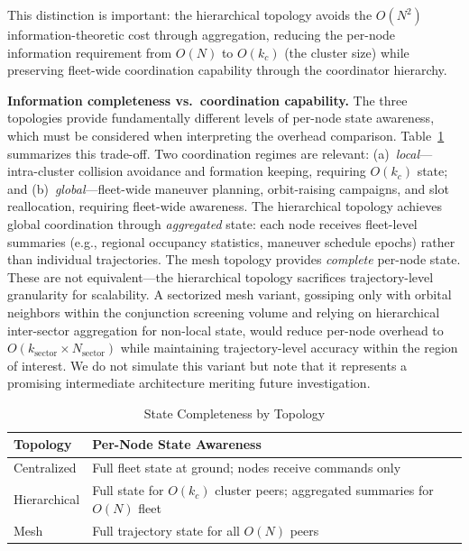 \documentclass[journal]{IEEEtran}
\begin{document}
This distinction is important: the hierarchical topology avoids the $O(N^2)$ information-theoretic cost through aggregation, reducing the per-node information requirement from $O(N)$ to $O(k_c)$ (the cluster size) while preserving fleet-wide coordination capability through the coordinator hierarchy.

\textbf{Information completeness vs.\ coordination capability.} The three topologies provide fundamentally different levels of per-node state awareness, which must be considered when interpreting the overhead comparison. Table~\ref{tab:state_completeness} summarizes this trade-off. Two coordination regimes are relevant: (a)~\emph{local}---intra-cluster collision avoidance and formation keeping, requiring $O(k_c)$ state; and (b)~\emph{global}---fleet-wide maneuver planning, orbit-raising campaigns, and slot reallocation, requiring fleet-wide awareness. The hierarchical topology achieves global coordination through \emph{aggregated} state: each node receives fleet-level summaries (e.g., regional occupancy statistics, maneuver schedule epochs) rather than individual trajectories. The mesh topology provides \emph{complete} per-node state. These are not equivalent---the hierarchical topology sacrifices trajectory-level granularity for scalability. A sectorized mesh variant, gossiping only with orbital neighbors within the conjunction screening volume and relying on hierarchical inter-sector aggregation for non-local state, would reduce per-node overhead to $O(k_{\text{sector}} \times N_{\text{sector}})$ while maintaining trajectory-level accuracy within the region of interest. We do not simulate this variant but note that it represents a promising intermediate architecture meriting future investigation.

\begin{table}[t]
    \centering
    \caption{State Completeness by Topology}
    \label{tab:state_completeness}
    \begin{tabular}{@{}lp{5.5cm}@{}}
        \toprule
        \textbf{Topology} & \textbf{Per-Node State Awareness} \\
        \midrule
        Centralized  & Full fleet state at ground; nodes receive commands only \\
        Hierarchical & Full state for $O(k_c)$ cluster peers; aggregated summaries for $O(N)$ fleet \\
        Mesh         & Full trajectory state for all $O(N)$ peers \\
        \bottomrule
    \end{tabular}
\end{table}
\end{document}
